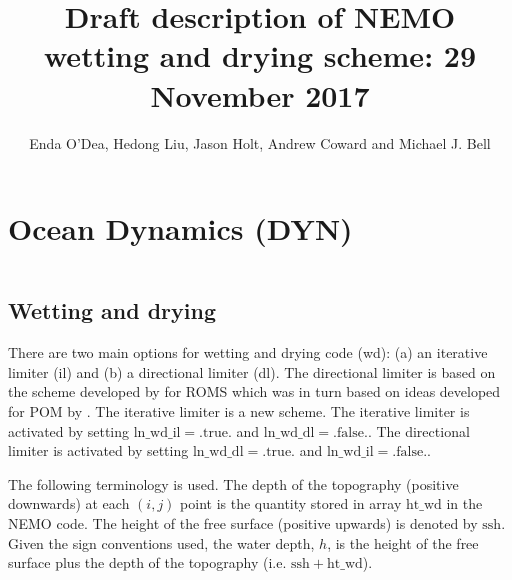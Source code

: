 



\title{Draft description of NEMO wetting and drying scheme:     29 November 2017 }

\author{ Enda O'Dea, Hedong Liu, Jason Holt, Andrew Coward  and Michael J. Bell  }


\chapter{Ocean Dynamics (DYN)}
\label{DYN}
\minitoc


$\ $\newline    %

\section{Wetting and drying }
\label{DYN_wetdry}

There are two main options for wetting and drying code (wd): 
(a) an iterative limiter (il) and (b) a directional limiter (dl). 
The directional limiter is based on the scheme developed by \cite{WarnerEtal13} for ROMS
which was in turn based on ideas developed for POM by \cite{Oey06}. The iterative
limiter is a new scheme.  The iterative limiter is activated by setting $\mathrm{ln\_wd\_il} = \mathrm{.true.}$
and $\mathrm{ln\_wd\_dl} = \mathrm{.false.}$. The directional limiter is activated
by setting $\mathrm{ln\_wd\_dl} = \mathrm{.true.}$ and $\mathrm{ln\_wd\_il} = \mathrm{.false.}$.


The following terminology is used. The depth of the topography (positive downwards)
at each $(i,j)$ point is the quantity stored in array $\mathrm{ht\_wd}$ in the NEMO code.
The height of the free surface (positive upwards) is denoted by $ \mathrm{ssh}$. Given the sign
conventions used, the water depth, $h$, is the height of the free surface plus the depth of the
topography (i.e. $\mathrm{ssh} + \mathrm{ht\_wd}$).

